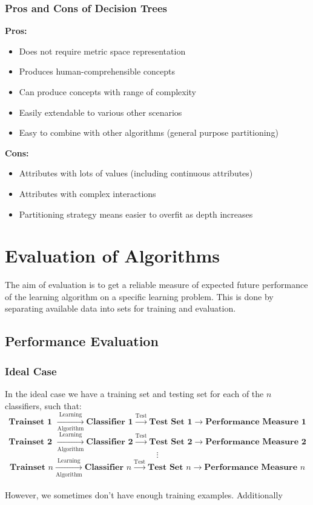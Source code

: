 \documentclass[12pt, a4paper]{book}
\begin{document}
\subsection{Pros and Cons of Decision Trees}
\textbf{Pros:}
\begin{itemize}
    \item Does not require metric space representation
    \item Produces human-comprehensible concepts
    \item Can produce concepts with range of complexity
    \item Easily extendable to various other scenarios
    \item Easy to combine with other algorithms (general purpose partitioning)\\
\end{itemize}
\textbf{Cons:}
\begin{itemize}
    \item Attributes with lots of values (including continuous attributes)
    \item Attributes with complex interactions
    \item Partitioning strategy means easier to overfit as depth increases
\end{itemize}
\newpage

\chapter{Evaluation of Algorithms}
The aim of evaluation is to get a reliable measure of expected future performance of the learning algorithm on a specific learning problem. This is done by separating available data into sets for training and evaluation.

\section{Performance Evaluation}
\subsection{Ideal Case}
In the ideal case we have a training set and testing set for each of the $n$ classifiers, such that:
$$\textbf{Trainset 1 } \xrightarrow[\text{Algorithm}]{\text{Learning}} \textbf{Classifier 1} \xrightarrow{\text{Test}} \textbf{Test Set 1} \xrightarrow{} \textbf{Performance Measure 1}$$
$$\textbf{Trainset 2 } \xrightarrow[\text{Algorithm}]{\text{Learning}} \textbf{Classifier 2} \xrightarrow{\text{Test}} \textbf{Test Set 2} \xrightarrow{} \textbf{Performance Measure 2}$$
$$\vdots$$
$$\textbf{Trainset $n$} \xrightarrow[\text{Algorithm}]{\text{Learning}} \textbf{Classifier $n$} \xrightarrow{\text{Test}} \textbf{Test Set $n$} \xrightarrow{} \textbf{Performance Measure $n$}$$\\
However, we sometimes don't have enough training examples. Additionally
\end{document}
